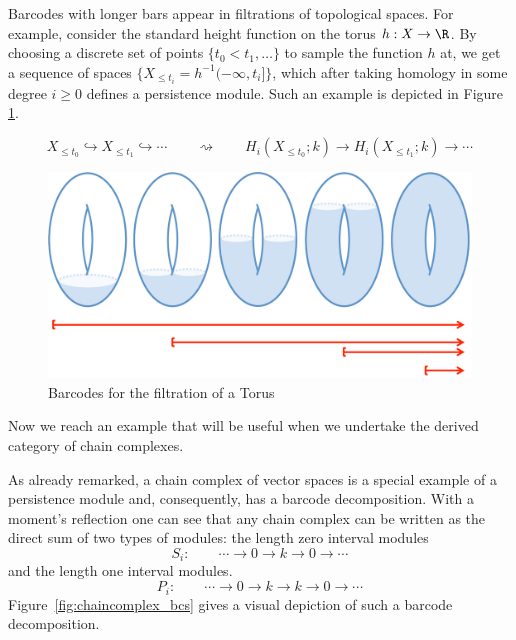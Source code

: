 \begin{ex}

Barcodes with longer bars appear in filtrations of topological spaces. For example, consider the standard height function on the torus $h:X\to\R$. By choosing a discrete set of points $\{t_0 < t_1,\ldots \}$ to sample the function $h$ at, we get a sequence of spaces $\{X_{\leq t_i}=h^{-1}(-\infty,t_i]\}$, which after taking homology in some degree $i\geq 0$ defines a persistence module. Such an example is depicted in Figure \ref{fig:persistence_torus}.

\[
X_{\leq t_0} \hookrightarrow X_{\leq t_1} \hookrightarrow \cdots \qquad \rightsquigarrow \qquad H_i(X_{\leq t_0};k) \to H_i(X_{\leq t_1};k) \to \cdots
\]

\end{ex}

\begin{figure}[ht]
    \centering
    \includegraphics[width=\textwidth]{persistence_torus_ltblue.pdf}
    \caption{Barcodes for the filtration of a Torus}
    \label{fig:persistence_torus}
\end{figure}

Now we reach an example that will be useful when we undertake the derived category of chain complexes.

\begin{ex}\label{ex:chaincomplex_bc}
As already remarked, a chain complex of vector spaces is a special example of a persistence module and, consequently, has a barcode decomposition. With a moment's reflection one can see that any chain complex can be written as the direct sum of two types of modules: 
the length zero interval modules
\[
S_i: \qquad \cdots \to 0 \to k \to 0 \to \cdots
\]
and the length one interval modules.
\[
P_i: \qquad \cdots \to 0 \to k \to k \to 0 \to \cdots
\]
Figure~\ref{fig:chaincomplex_bcs} gives a visual depiction of such a barcode decomposition.
\end{ex}

